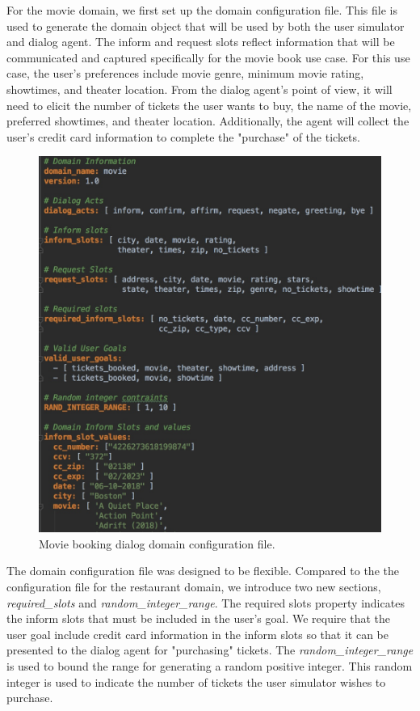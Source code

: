 For the movie domain, we first set up the domain configuration file. This file is used to generate the domain object that will be used by both the user simulator and dialog agent. The inform and request slots reflect information that will be communicated and captured specifically for the movie book use case. For this use case, the user's preferences include movie genre, minimum movie rating, showtimes, and theater location. From the dialog agent's point of view, it will need to elicit the number of tickets the user wants to buy, the name of the movie, preferred showtimes, and theater location. Additionally, the agent will collect the user's credit card information to complete the "purchase" of the tickets. 

\begin{figure}[h!]
	\centering
	\includegraphics[scale=.25]{diagrams/movie_dialog_domain.jpeg}
	\caption{ Movie booking dialog domain configuration file. }
	\label{fig:movie_domain}
\end{figure}

The domain configuration file was designed to be flexible. Compared to the the configuration file for the restaurant domain, we introduce two new sections, \textit{required\_slots} and \textit{random\_integer\_range}. The required slots property indicates the inform slots that must be included in the user's goal. We require that the user goal include credit card information in the inform slots so that it can be presented to the dialog agent for "purchasing" tickets. The \textit{random\_integer\_range} is used to bound the range for generating a random positive integer. This random integer is used to indicate the number of tickets the user simulator wishes to purchase. 

